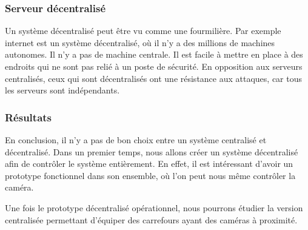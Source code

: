 \subsubsection{Serveur décentralisé}
\label{sec:centralise_decentralise}
Un système décentralisé peut être vu comme une fourmilière. Par exemple internet est un système décentralisé, où il n'y a des millions de machines autonomes. Il n'y a pas de machine centrale.
Il est facile à mettre en place à des endroits qui ne sont pas relié à un poste de sécurité.
En opposition aux serveurs centralisés, ceux qui sont décentralisés ont une résistance aux attaques, car tous les serveurs sont indépendants.

\subsubsection{Résultats}
\label{sec:centralise_resultat}
En conclusion, il n'y a pas de bon choix entre un système centralisé et décentralisé.
Dans un premier temps, nous allons créer un système décentralisé afin de contrôler le système entièrement. En effet, il est intéressant
d'avoir un prototype fonctionnel dans son ensemble, où l'on peut nous même contrôler la caméra.

Une fois le prototype décentralisé opérationnel, nous pourrons étudier la version centralisée permettant d'équiper des carrefours ayant des caméras à proximité.
